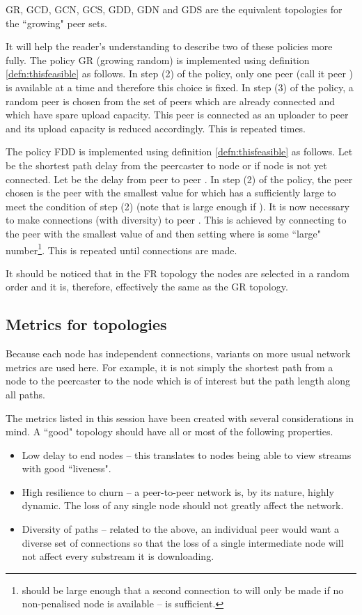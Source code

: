 GR, GCD, GCN, GCS, GDD, GDN and GDS are the equivalent topologies for the
``growing" peer sets.

It will help the reader's understanding to describe two of these policies more fully.
The policy GR (growing random) is implemented using definition \ref{defn:thisfeasible}
as follows.  In step (2) of the policy, only one peer (call it peer ) 
is available at a time
and therefore this choice is fixed.  In step (3) of the policy, a random peer is
chosen from the set of peers which are already connected and which have spare
upload capacity.  This peer is connected as an uploader to peer  and its upload
capacity is reduced accordingly.  This is repeated  times.

The policy FDD is implemented using definition \ref{defn:thisfeasible} as follows.
Let  be the shortest path delay from the peercaster
to node  or  if node  is not
yet connected.  Let  be the delay from peer  to peer .
In step (2) of the policy, the peer  chosen is the peer with the
smallest value for  which has a sufficiently large  to meet the
condition of step (2) (note that  is large enough if ).  It is now
necessary to make  connections (with diversity) to peer .  This is achieved
by connecting to the peer with the smallest value of  and then setting
 where  is some ``large" number\footnote{ should be large
enough that a second connection to  will only be made if no non-penalised node is
available --  is sufficient.}.  This is repeated until  connections
are made.

\begin{remark}
It should be noticed that in the FR topology the nodes are selected in 
a random order and it is, therefore, effectively the same as the GR topology.
\end{remark}

\subsection{Metrics for topologies}

Because each node has  independent connections, variants on more 
usual network metrics are used here.  For example, it is not 
simply the shortest path
from a node to the peercaster to the node which is of interest but the 
path length along all paths.

The metrics listed in this session have been created with several
considerations in mind.  A ``good" topology should have all or
most of the following properties.
\begin{itemize}
\item Low delay to end nodes -- this translates to nodes being able to
view streams with good ``liveness".
\item High resilience to churn -- a peer-to-peer network is, by its
nature, highly dynamic.  The loss of any single node should
not greatly affect the network.  
\item Diversity of paths -- related to the above,
an individual peer would want a diverse
set of connections so that the loss of a single intermediate 
node will not affect every substream it is downloading.
\end{itemize}

